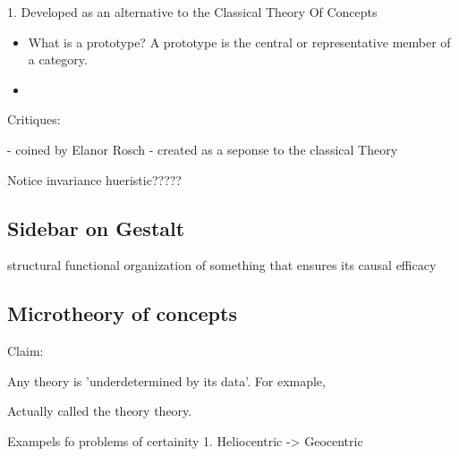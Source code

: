 \documentclass[twoside]{article}
\begin{document}
1. Developed as an alternative to the Classical Theory Of Concepts

\begin{itemize}
  \item What is a prototype? A prototype is the central or representative member
        of a category.
  \item
\end{itemize}

Critiques:

- coined by Elanor Rosch
- created as a seponse to the classical Theory

Notice invariance hueristic?????
\subsection{Sidebar on Gestalt}
structural functional organization of something that ensures its
causal efficacy


\subsection{Microtheory of concepts}
Claim:

Any theory is 'underdetermined by its data'. For exmaple,

Actually called the theory theory.

Exampels fo problems of certainity
1. Heliocentric -> Geocentric
\end{document}
